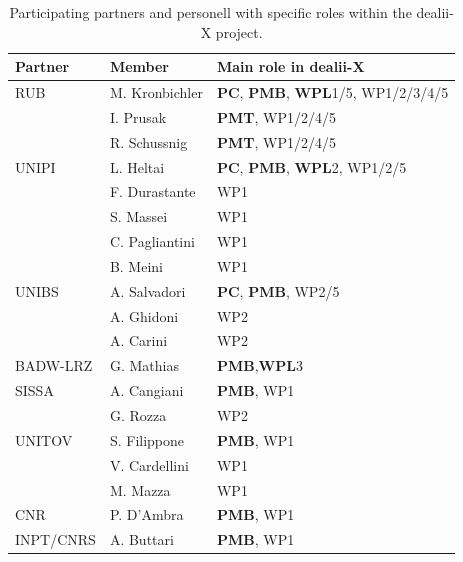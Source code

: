 \documentclass[a4paper,12pt]{article}
\begin{document}
\begin{center}
    \small
    \renewcommand{\arraystretch}{1.0}
    \begin{longtable}{|l|l|l|}
    \caption{Participating partners and personell with specific roles within the dealii-X project.}
    \label{tab:personnel_involved}\\
    \hline
    \textbf{Partner} & \textbf{Member} & \textbf{Main role in dealii-X} \\
    \hline
    RUB   
    & M. Kronbichler & \textbf{PC}, \textbf{PMB}, \textbf{WPL}1/5, WP1/2/3/4/5\\
    & I. Prusak & \textbf{PMT}, WP1/2/4/5\\
	& R. Schussnig & \textbf{PMT}, WP1/2/4/5\\
    UNIPI 
    & L. Heltai & \textbf{PC}, \textbf{PMB}, \textbf{WPL}2, WP1/2/5 \\
    & F. Durastante & WP1 \\
    & S. Massei & WP1 \\
    & C. Pagliantini & WP1 \\
    & B. Meini & WP1\\
    UNIBS 
    & A. Salvadori & \textbf{PC}, \textbf{PMB}, WP2/5 \\
    & A. Ghidoni & WP2 \\
    & A. Carini & WP2
    \\
    BADW-LRZ 
    & G. Mathias & \textbf{PMB},\textbf{WPL}3
    \\
    SISSA  
    & A. Cangiani & \textbf{PMB}, WP1 \\
    & G. Rozza & WP2 \\
    UNITOV 
    & S. Filippone & \textbf{PMB}, WP1 \\
    & V. Cardellini & WP1\\
    & M. Mazza & WP1\\
    CNR 
    & P. D’Ambra & \textbf{PMB}, WP1
    \\
    INPT/CNRS 
    & A. Buttari & \textbf{PMB}, WP1

\end{longtable}
\end{center}
\end{document}
